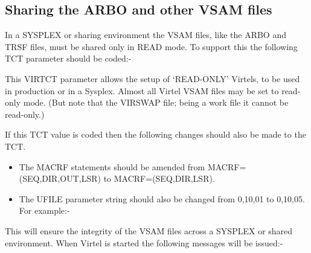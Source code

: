 \documentclass[letterpaper,10pt,english]{sphinxmanual}
\begin{document}
\subsection{Sharing the ARBO and other VSAM files}
\label{\detokenize{connectivity_guide:sharing-the-arbo-and-other-vsam-files}}
In a SYSPLEX or sharing environment the VSAM files, like the ARBO and TRSF files, must be shared only in READ mode. To support this the following TCT parameter should be coded:-

\begin{sphinxVerbatim}[commandchars=\\\{\}]
\end{sphinxVerbatim}

This VIRTCT parameter allows the setup of ‘READ-ONLY’ Virtels, to be used in production or in a Sysplex. Almost all Virtel VSAM files may be set to read-only mode. (But note that the VIRSWAP file; being a work file it cannot be read-only.)

If this TCT value is coded then the following changes should also be made to the TCT.
\begin{itemize}
\item {} 
The MACRF statements should be amended from MACRF=(SEQ,DIR,OUT,LSR) to MACRF=(SEQ,DIR,LSR).

\item {} 
The UFILE parameter string should also be changed from 0,10,01 to 0,10,05. For example:-

\end{itemize}

\begin{sphinxVerbatim}[commandchars=\\\{\}]
  
\end{sphinxVerbatim}

This will ensure the integrity of the VSAM files across a SYSPLEX or shared environment. When Virtel is started the following messages will be issued:-

\begin{sphinxVerbatim}[commandchars=\\\{\}]
      
   
  
   
   
  
   
  
   
  
  
\end{sphinxVerbatim}
\end{document}
